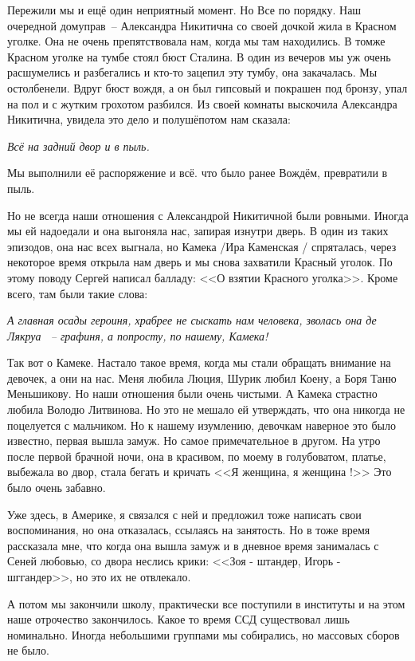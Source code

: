 Пережили мы и ещё один неприятный момент. Но Все по порядку. Наш очередной домуправ~-- Александра Никитична со своей дочкой жила в Красном уголке. Она не очень препятствовала нам, когда мы там находились. В томже Красном уголке на тумбе стоял бюст Сталина. В один из вечеров мы уж очень расшумелись и разбегались и кто-то зацепил эту тумбу, она закачалась. Мы остолбенели. Вдруг бюст вождя, а он был гипсовый и покрашен под бронзу, упал на пол и с жутким грохотом разбился. Из своей комнаты выскочила Александра Никитична, увидела это дело и полушёпотом нам сказала:

\textit{Всё на задний двор и в пыль.}

Мы выполнили её распоряжение и всё. что было ранее Вождём, превратили в пыль.

Но не всегда наши отношения с Александрой Никитичной были ровными. Иногда мы ей надоедали и она выгоняла нас, запирая изнутри дверь. В один из таких эпизодов, она нас всех выгнала, но Камека /Ира Каменская / спряталась, через некоторое время открыла нам дверь и мы снова захватили Красный уголок. По этому поводу Сергей написал балладу: <<О взятии Красного уголка>>. Кроме всего, там были такие слова:

\indent

{\itshape
А главная осады героиня, храбрее не сыскать нам человека, зволась она де Лякруа ~-- графиня, а попросту, по нашему, Камека!
}

\indent

Так вот о Камеке. Настало такое время, когда мы стали обращать внимание на девочек, а они на нас. Меня любила Люция, Шурик любил Коену, а Боря Таню Меньшикову. Но наши отношения были очень чистыми. А Камека страстно любила Володю Литвинова. Но это не мешало ей утверждать, что она никогда не поцелуется с мальчиком. Но к нашему изумлению, девочкам наверное это было известно, первая вышла замуж. Но самое примечательное в другом. На утро после первой брачной ночи, она в красивом, по моему в голубоватом, платье, выбежала во двор, стала бегать и кричать <<Я женщина, я женщина !>> Это было очень забавно.

Уже здесь, в Америке, я связался с ней и предложил тоже написать свои воспоминания, но она отказалась, ссылаясь на занятость. Но в тоже время рассказала мне, что когда она вышла замуж и в дневное время занималась с Сеней любовью, со двора неслись крики: <<Зоя - штандер, Игорь - шггандер>>, но это их не отвлекало.

А потом мы закончили школу, практически все поступили в институты и на этом наше отрочество закончилось.
Какое то время ССД существовал лишь номинально. Иногда небольшими группами мы собирались, но массовых сборов не было.

